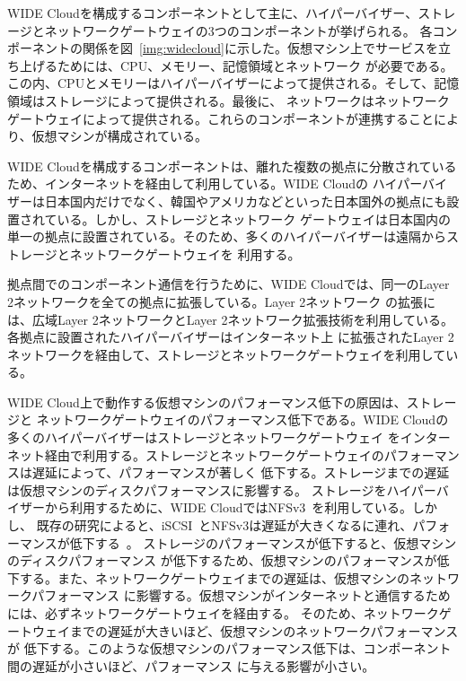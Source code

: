 WIDE Cloudを構成するコンポーネントとして主に、ハイパーバイザー、ストレージとネットワークゲートウェイの3つのコンポーネントが挙げられる。
各コンポーネントの関係を図~\ref{img:widecloud}に示した。仮想マシン上でサービスを立ち上げるためには、CPU、メモリー、記憶領域とネットワーク
が必要である。この内、CPUとメモリーはハイパーバイザーによって提供される。そして、記憶領域はストレージによって提供される。最後に、
ネットワークはネットワークゲートウェイによって提供される。これらのコンポーネントが連携することにより、仮想マシンが構成されている。

WIDE Cloudを構成するコンポーネントは、離れた複数の拠点に分散されているため、インターネットを経由して利用している。WIDE Cloudの
ハイパーバイザーは日本国内だけでなく、韓国やアメリカなどといった日本国外の拠点にも設置されている。しかし、ストレージとネットワーク
ゲートウェイは日本国内の単一の拠点に設置されている。そのため、多くのハイパーバイザーは遠隔からストレージとネットワークゲートウェイを
利用する。

拠点間でのコンポーネント通信を行うために、WIDE Cloudでは、同一のLayer 2ネットワークを全ての拠点に拡張している。Layer 2ネットワーク
の拡張には、広域Layer 2ネットワークとLayer 2ネットワーク拡張技術を利用している。各拠点に設置されたハイパーバイザーはインターネット上
に拡張されたLayer 2ネットワークを経由して、ストレージとネットワークゲートウェイを利用している。

WIDE Cloud上で動作する仮想マシンのパフォーマンス低下の原因は、ストレージと
ネットワークゲートウェイのパフォーマンス低下である。WIDE Cloudの多くのハイパーバイザーはストレージとネットワークゲートウェイ
をインターネット経由で利用する。ストレージとネットワークゲートウェイのパフォーマンスは遅延によって、パフォーマンスが著しく
低下する。ストレージまでの遅延は仮想マシンのディスクパフォーマンスに影響する。
ストレージをハイパーバイザーから利用するために、WIDE CloudではNFSv3~\cite{rfc:nfsv3}を利用している。しかし、
既存の研究によると、iSCSI~\cite{rfc:iscsi}とNFSv3は遅延が大きくなるに連れ、パフォーマンスが低下する~\cite{usenix:nfsperformance}。
ストレージのパフォーマンスが低下すると、仮想マシンのディスクパフォーマンス
が低下するため、仮想マシンのパフォーマンスが低下する。また、ネットワークゲートウェイまでの遅延は、仮想マシンのネットワークパフォーマンス
に影響する。仮想マシンがインターネットと通信するためには、必ずネットワークゲートウェイを経由する。
そのため、ネットワークゲートウェイまでの遅延が大きいほど、仮想マシンのネットワークパフォーマンスが
低下する。このような仮想マシンのパフォーマンス低下は、コンポーネント間の遅延が小さいほど、パフォーマンス
に与える影響が小さい。

